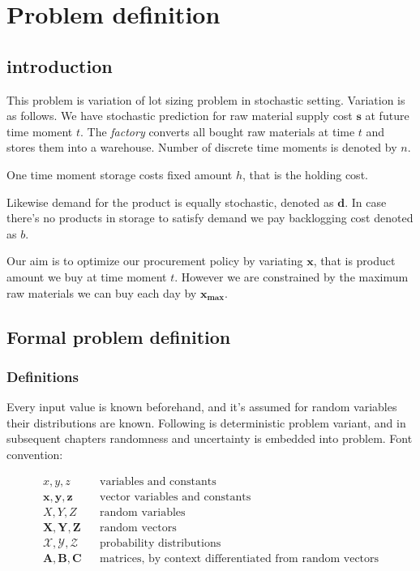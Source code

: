 
\chapter{Problem definition}
\label{chap:prob-def}
\section{introduction}

This problem is variation of lot sizing problem in stochastic setting. Variation is as follows. We have stochastic prediction for raw material supply cost $\mathbf{s}$ at future time moment $t$. The \emph{factory} converts all bought raw materials at time $t$ and stores them into a warehouse. Number of discrete time moments is denoted by $n$.

One time moment storage costs fixed amount $h$, that is the holding cost.

Likewise demand for the product is equally stochastic, denoted as $\mathbf{d}$. In case there's no products in storage to satisfy demand we pay backlogging cost denoted as $b$.

Our aim is to optimize our procurement policy by variating $\mathbf{x}$, that is product amount we buy at time moment $t$. However we are constrained by the maximum raw materials we can buy each day by $\mathbf{x_{\text{max}}}$.

\section{Formal problem definition}
\label{sec:Formal problem definition}

\subsection{Definitions}
\label{sub:Definitions}

Every input value is known beforehand, and it's assumed for random variables their distributions are known. Following is deterministic problem variant, and in subsequent chapters randomness and uncertainty is embedded into problem. Font convention:

\begin{align*}
x, y, z && \text{variables and constants} \\
\mathbf{x, y, z} && \text{vector variables and constants} \\
X, Y, Z && \text{random variables} \\
\mathbf{X, Y, Z} && \text{random vectors} \\
\mathcal{X, Y, Z} && \text{probability distributions} \\
\mathbf{A, B, C} && \text{matrices, by context differentiated from random vectors}
\end{align*}

